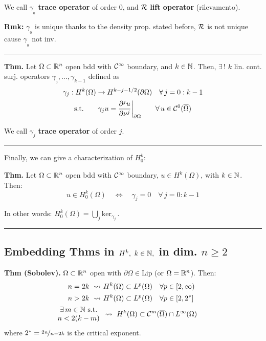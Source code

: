 We call $\gamma_{_0}$ \textbf{trace operator} of order 0, and $\mathcal{R}$ \textbf{lift operator} (rilevamento).

\smallskip

\textbf{Rmk:} $\gamma_{_0}$ is unique thanks to the density prop. stated before, $\mathcal{R}$ is not unique cause $\gamma_{_0}$ not inv.

\rule{0.31\textwidth}{0.2pt}
\smallskip

\textbf{Thm.} Let $\Omega\subset\mathbb{R}^n$ open bdd with $\mathcal{C}^\infty$ boundary, and $k\in\mathbb{N}$. Then, $\exists\,!$ $k$ lin. cont. surj. operators $\gamma_{_0},\dots,\gamma_{k-1}$ defined as
\begin{gather*}
\gamma_j:H^k(\Omega)\to H^{k-j-1/2}(\partial\Omega)\quad\forall\,j=0:k-1\\
\text{s.t.}\qquad
\gamma_j u=\frac{\partial^j u}{\partial\nu^j} \bigg|_{\partial\Omega}\qquad\forall\, u\in \mathcal{C}^0(\overline{\Omega})
\end{gather*}

We call $\gamma_j$ \textbf{trace operator} of order $j$.

\rule{0.31\textwidth}{0.2pt}
\smallskip

Finally, we can give a characterization of $H^k_0$:

\smallskip

\textbf{Thm.} Let $\Omega\subset\mathbb{R}^n$ open bdd with $\mathcal{C}^\infty$ boundary, $u\in H^k(\Omega)$, with $k\in\mathbb{N}$. Then:
\begin{equation*}
u\in H^k_0(\Omega) \quad\Longleftrightarrow\quad \gamma_j=0\quad\forall\,j=0:k-1
\end{equation*}

In other words: $H^k_0(\Omega)=\bigcup_j\text{ker}_{\gamma_j}\,.$

\rule{0.31\textwidth}{0.2pt}


\subsection{\texorpdfstring{\color{red}Embedding Thms in \texorpdfstring{$H^k,\ k\in\mathbb{N},$}{C} in dim. \texorpdfstring{$n\geq 2$}{C}}{}}


\textbf{Thm (Sobolev).} $\Omega\subset \mathbb{R}^n$ open with $\partial\Omega\in\text{Lip}$ (or $\Omega=\mathbb{R}^n$). Then:
\begin{align*}
n=2k\ \leadsto\ &H^k(\Omega)\subset L^p(\Omega)\quad \forall p\in [2,\infty) \\
n>2k\ \leadsto\ &H^k(\Omega)\subset L^p(\Omega)\quad \forall p\in [2,2^*] \\
\begin{array}{c}
\exists\, m\in\mathbb{N}\text{ s.t.}\\
n<2(k-m)   
\end{array}& 
\leadsto\ H^k(\Omega)\subset \mathcal{C}^m(\overline{\Omega})\cap L^\infty(\Omega)\qquad
\end{align*}
where $2^*=\nicefrac{2n}{n-2k}$ is the critical exponent.

